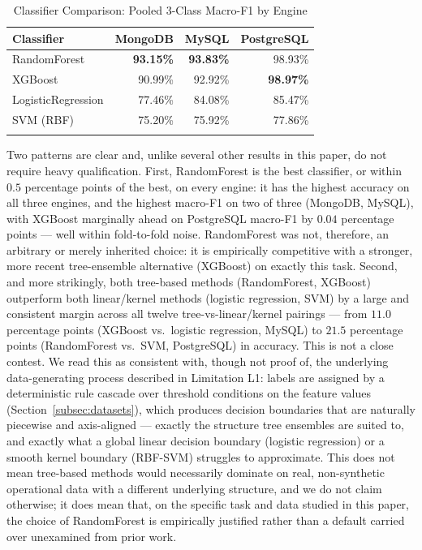 \documentclass[iicol,pdflatex,sn-mathphys-num]{sn-jnl}
\theoremstyle{thmstyleone}
\theoremstyle{thmstylethree}
\begin{document}
\begin{table}[h]
\caption{Classifier Comparison: Pooled 3-Class Macro-F1 by Engine}\label{tab:classifier-comparison-f1}
\begin{tabular}{@{}lrrr@{}}
\toprule
Classifier & MongoDB & MySQL & PostgreSQL \\
\midrule
RandomForest        & \textbf{93.15\%} & \textbf{93.83\%} & 98.93\% \\
XGBoost              & 90.99\% & 92.92\% & \textbf{98.97\%} \\
LogisticRegression   & 77.46\% & 84.08\% & 85.47\% \\
SVM (RBF)            & 75.20\% & 75.92\% & 77.86\% \\
\botrule
\end{tabular}
\end{table}

Two patterns are clear and, unlike several other results in this
paper, do not require heavy qualification. First, RandomForest is
the best classifier, or within $0.5$ percentage points of the best,
on every engine: it has the highest accuracy on all three engines, and
the highest macro-F1 on two of three (MongoDB, MySQL), with XGBoost
marginally ahead on PostgreSQL macro-F1 by $0.04$ percentage
points --- well within fold-to-fold noise. RandomForest was not,
therefore, an arbitrary or merely inherited choice: it is empirically
competitive with a stronger, more recent tree-ensemble alternative
(XGBoost) on exactly this task. Second, and more strikingly, both
tree-based methods (RandomForest, XGBoost) outperform both
linear/kernel methods (logistic regression, SVM) by a large and
consistent margin across all twelve tree-vs-linear/kernel pairings ---
from $11.0$ percentage points (XGBoost vs.\ logistic regression,
MySQL) to $21.5$ percentage points (RandomForest vs.\ SVM,
PostgreSQL) in accuracy. This is not a close contest. We read this as
consistent with, though not proof of, the underlying data-generating
process described in Limitation L1: labels are assigned by a
deterministic rule cascade over threshold conditions on the feature
values (Section~\ref{subsec:datasets}), which produces decision
boundaries that are naturally piecewise and axis-aligned --- exactly
the structure tree ensembles are suited to, and exactly what a global
linear decision boundary (logistic regression) or a smooth kernel
boundary (RBF-SVM) struggles to approximate. This does not mean
tree-based methods would necessarily dominate on real, non-synthetic
operational data with a different underlying structure, and we do not
claim otherwise; it does mean that, on the specific task and data
studied in this paper, the choice of RandomForest is empirically
justified rather than a default carried over unexamined from prior
work.
\end{document}
